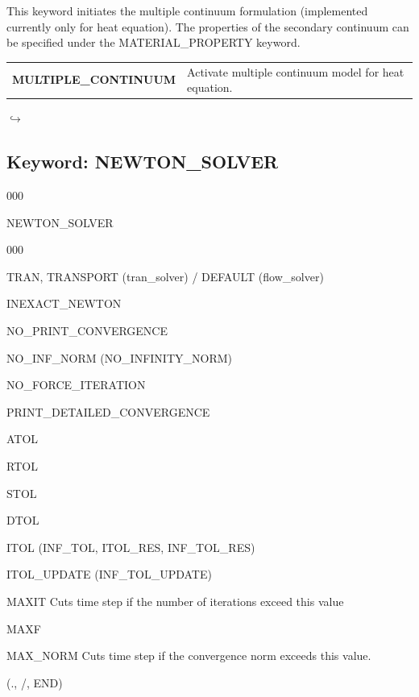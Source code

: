 \documentclass[12pt]{article}
\newcommand\return{{\hfill$\hookrightarrow$}}
\begin{document}
This keyword initiates the multiple continuum formulation (implemented currently only for heat equation). The properties of the secondary continuum can be
specified under the MATERIAL\_PROPERTY keyword.

\begin{tabularx}{\linewidth}{lX}
\bf MULTIPLE\_CONTINUUM & Activate multiple continuum model for heat equation. 
\end{tabularx}

\hyperlink{target_key}{\return}


\newpage
\protect\hypertarget{target_newt}{}

\subsection{Keyword: NEWTON\_SOLVER}


\begin{deflist}{000}
\item[NEWTON\_SOLVER] ~
\begin{deflist}{000}
\item[TRAN, TRANSPORT (tran\_solver) / DEFAULT (flow\_solver)]
\item[INEXACT\_NEWTON]
\item[NO\_PRINT\_CONVERGENCE]
\item[NO\_INF\_NORM (NO\_INFINITY\_NORM)]
\item[NO\_FORCE\_ITERATION]
\item[PRINT\_DETAILED\_CONVERGENCE]
\item[ATOL]
\item[RTOL]
\item[STOL]
\item[DTOL]
\item[ITOL (INF\_TOL, ITOL\_RES, INF\_TOL\_RES)]
\item[ITOL\_UPDATE (INF\_TOL\_UPDATE)]
\item[MAXIT] Cuts time step if the number of iterations exceed this value
\item[MAXF]
\item[MAX\_NORM]  Cuts time step if the convergence norm exceeds this value. 
\end{deflist}
\item[(., /, END)]
\end{deflist}
\end{document}
